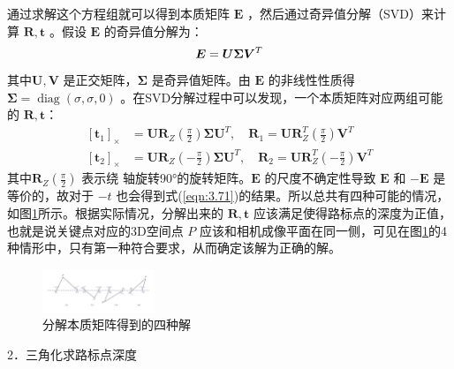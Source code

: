 通过求解这个方程组就可以得到本质矩阵  $\bm{E} $ ，然后通过奇异值分解（SVD）来计算 $\boldsymbol{R}, \boldsymbol{t} $ 。假设  $\bm{E} $  的奇异值分解为：
\begin{equation}
\label{eqn:3.70}
\setlength{\abovedisplayskip}{6pt}
\setlength{\belowdisplayskip}{6pt}
\boldsymbol{E}= \boldsymbol{U} \boldsymbol{\Sigma} \boldsymbol{V}^{T}
\end{equation}
其中$\boldsymbol{U},\boldsymbol{V} $ 是正交矩阵，$\boldsymbol{\Sigma} $ 是奇异值矩阵。由 $\bm{E} $ 的非线性性质得 $\boldsymbol{\Sigma}=\operatorname{diag}(\sigma, \sigma, 0) $ 。在SVD分解过程中可以发现，一个本质矩阵对应两组可能的 $\boldsymbol{R}, \boldsymbol{t} $：
\begin{equation}
\label{eqn:3.71}
\begin{aligned}
\left[\boldsymbol{t}_{1}\right]_\times&= \boldsymbol{U} \boldsymbol{R}_{Z}\left(\frac{\pi}{2}\right) \boldsymbol{\Sigma} \boldsymbol{U}^{T}, \quad \boldsymbol{R}_{1}=\boldsymbol{U} \boldsymbol{R}_{Z}^{T}\left(\frac{\pi}{2}\right) \boldsymbol{V}^{T} \\
\left[\boldsymbol{t}_{2}\right]_\times &= \boldsymbol{U} \boldsymbol{R}_{Z}\left(-\frac{\pi}{2}\right) \boldsymbol{\Sigma} \boldsymbol{U}^{T}, \quad \boldsymbol{R}_{2}=\boldsymbol{U} \boldsymbol{R}_{Z}^{T}\left(-\frac{\pi}{2}\right) \boldsymbol{V}^{T} 
\end{aligned}
\end{equation}
其中$\boldsymbol{R}_{Z}\left(\frac{\pi}{2}\right) $ 表示绕 轴旋转90°的旋转矩阵。$\bm{E} $ 的尺度不确定性导致 $\bm{E} $ 和 $-\bm{E} $ 是等价的，故对于 $-t$ 也会得到式(\ref{eqn:3.71})的结果。所以总共有四种可能的情况，如图\ref{fig3_9}所示。根据实际情况，分解出来的 $\boldsymbol{R}, \boldsymbol{t} $ 应该满足使得路标点的深度为正值，也就是说关键点对应的3D空间点 $P$ 应该和相机成像平面在同一侧，可见在图\ref{fig3_9}的4种情形中，只有第一种符合要求，从而确定该解为正确的解。
\begin{figure}[h]\setlength{\belowcaptionskip}{-12pt}
	\centering
	\includegraphics[width=0.3\textwidth, angle=-90]{figures/chapter3/fig3_9}
	\caption{分解本质矩阵得到的四种解}\label{fig3_9}
\end{figure}

2．三角化求路标点深度

